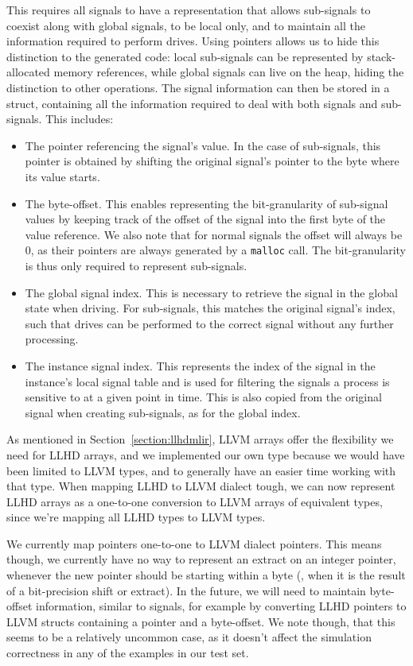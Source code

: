 This requires all signals to have a representation that allows sub-signals to coexist along with global signals, to be local only, and to maintain all the information required to perform drives. Using pointers allows us to hide this distinction to the generated code: local sub-signals can be represented by stack-allocated memory references, while global signals can live on the heap, hiding the distinction to other operations. The signal information can then be stored in a struct, containing all the information required to deal with both signals and sub-signals. This includes:

\begin{itemize}
    \item The pointer referencing the signal's value. In the case of sub-signals, this pointer is obtained by shifting the original signal's pointer to the byte where its value starts.
    \item The byte-offset. This enables representing the bit-granularity of sub-signal values by keeping track of the offset of the signal into the first byte of the value reference. We also note that for normal signals the offset will always be $0$, as their pointers are always generated by a \texttt{malloc} call. The bit-granularity is thus only required to represent sub-signals.
    \item The global signal index. This is necessary to retrieve the signal in the global state when driving. For sub-signals, this matches the original signal's index, such that drives can be performed to the correct signal without any further processing.
    \item The instance signal index. This represents the index of the signal in the instance's local signal table and is used for filtering the signals a process is sensitive to at a given point in time. This is also copied from the original signal when creating sub-signals, as for the global index.
\end{itemize}

As mentioned in Section~\ref{section:llhdmlir}, LLVM arrays offer the flexibility we need for LLHD arrays, and we implemented our own type because we would have been limited to LLVM types, and to generally have an easier time working with that type. When mapping LLHD to LLVM dialect tough, we can now represent LLHD arrays as a one-to-one conversion to LLVM arrays of equivalent types, since we're mapping all LLHD types to LLVM types.

We currently map pointers one-to-one to LLVM dialect pointers. This means though, we currently have no way to represent an extract on an integer pointer, whenever the new pointer should be starting within a byte (\ie, when it is the result of a bit-precision shift or extract). In the future, we will need to maintain byte-offset information, similar to signals, for example by converting LLHD pointers to LLVM structs containing a pointer and a byte-offset. We note though, that this seems to be a relatively uncommon case, as it doesn't affect the simulation correctness in any of the examples in our test set.


